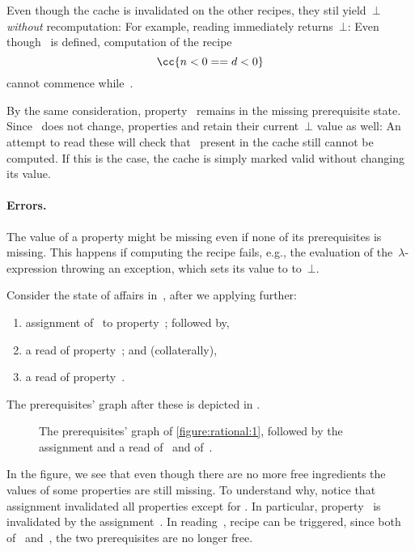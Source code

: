 Even though the cache is invalidated on the other recipes, they stil
yield~$⊥$ \emph{without} recomputation: For example, reading
 immediately returns~$⊥$: Even though~ is defined,
computation of the recipe \[
  \cc{n < 0 == d < 0}
\] cannot commence while~.

By the same consideration, property~ remains in the missing
prerequisite state. Since~ does not change, properties 
and  retain their current~$⊥$ value as well: An attempt to
read these will check that~ present in the cache still cannot
be computed. If this is the case, the cache is simply marked valid
without changing its value.

\paragraph{Errors.}
The value of a property might be missing even if none of its prerequisites is
missing. This happens if computing the recipe fails, e.g., the \Java evaluation
of the~$λ$-expression throwing an exception, which sets its value to to~$⊥$.

Consider the state of affairs in~, after we applying further:
\begin{enumerate}
  \item assignment of~ to property~; followed by,
  \item a read of property~; and (collaterally),
  \item a read of property~.
\end{enumerate}

The prerequisites' graph after these is depicted in .

\begin{figure}
  \caption{\label{figure:rational:2}%
    The prerequisites' graph of \cref{figure:rational:1},
    followed by the assignment  and a read
    of~ and of~.
  }
  \begin{adjustbox}{max width=\columnwidth}
    
  \end{adjustbox}
\end{figure}

In the figure, we see that even though there are no more free ingredients the
values of some properties are still missing. To understand why, notice that
assignment  invalidated all properties except for . In
particular, property~ is invalidated by the assignment~. In
reading~, recipe can be triggered, since both of~ and~, the
two prerequisites are no longer free.

